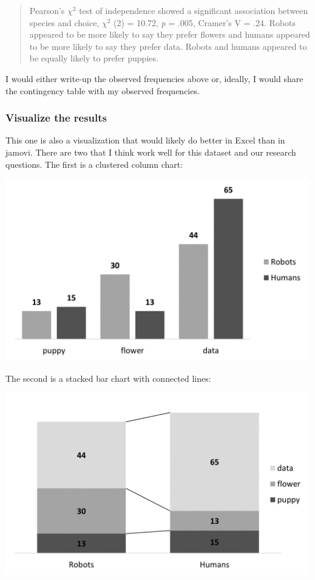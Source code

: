 \documentclass[
]{book}
\begin{document}
\begin{quote}
Pearson's \(\chi^2\) test of independence showed a significant association between species and choice, \(\chi^2\) (2) = 10.72, \emph{p} = .005, Cramer's V = .24. Robots appeared to be more likely to say they prefer flowers and humans appeared to be more likely to say they prefer data. Robots and humans appeared to be equally likely to prefer puppies.
\end{quote}

I would either write-up the observed frequencies above or, ideally, I would share the contingency table with my observed frequencies.

\hypertarget{visualize-the-results-4}{%
\subsubsection{Visualize the results}\label{visualize-the-results-4}}

This one is also a visualization that would likely do better in Excel than in jamovi. There are two that I think work well for this dataset and our research questions. The first is a clustered column chart:

\includegraphics[width=5.20833in,height=\textheight]{images/11-independence/independence_excel1.png}

The second is a stacked bar chart with connected lines:

\includegraphics[width=5.20833in,height=\textheight]{images/11-independence/independence_excel2.png}
\end{document}
